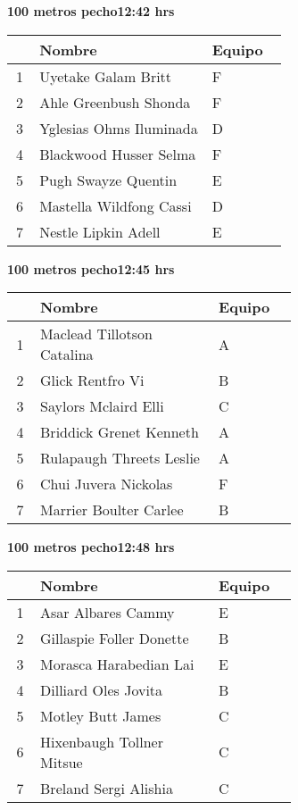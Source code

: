 \begin{minipage}{0.95\linewidth}
\begin{center}
\textbf{
100 metros pecho\hspace{1cm}12:42 hrs}
\end{center}
\begin{tabular}{cp{0.63\linewidth}l}
\hline
& \textbf{Nombre} & \textbf{Equipo} \\ \hline
1 & Uyetake Galam Britt & F \\ 
2 & Ahle Greenbush Shonda & F \\ 
3 & Yglesias Ohms Iluminada & D \\ 
4 & Blackwood Husser Selma & F \\ 
5 & Pugh Swayze Quentin & E \\ 
6 & Mastella Wildfong Cassi & D \\ 
7 & Nestle Lipkin Adell & E \\ 
\end{tabular}
\end{minipage}
\begin{minipage}{0.95\linewidth}
\begin{center}
\textbf{
100 metros pecho\hspace{1cm}12:45 hrs}
\end{center}
\begin{tabular}{cp{0.63\linewidth}l}
\hline
& \textbf{Nombre} & \textbf{Equipo} \\ \hline
1 & Maclead Tillotson Catalina & A \\ 
2 & Glick Rentfro Vi & B \\ 
3 & Saylors Mclaird Elli & C \\ 
4 & Briddick Grenet Kenneth & A \\ 
5 & Rulapaugh Threets Leslie & A \\ 
6 & Chui Juvera Nickolas & F \\ 
7 & Marrier Boulter Carlee & B \\ 
\end{tabular}
\end{minipage}
\begin{minipage}{0.95\linewidth}
\begin{center}
\textbf{
100 metros pecho\hspace{1cm}12:48 hrs}
\end{center}
\begin{tabular}{cp{0.63\linewidth}l}
\hline
& \textbf{Nombre} & \textbf{Equipo} \\ \hline
1 & Asar Albares Cammy & E \\ 
2 & Gillaspie Foller Donette & B \\ 
3 & Morasca Harabedian Lai & E \\ 
4 & Dilliard Oles Jovita & B \\ 
5 & Motley Butt James & C \\ 
6 & Hixenbaugh Tollner Mitsue & C \\ 
7 & Breland Sergi Alishia & C \\ 
\end{tabular}
\end{minipage}

